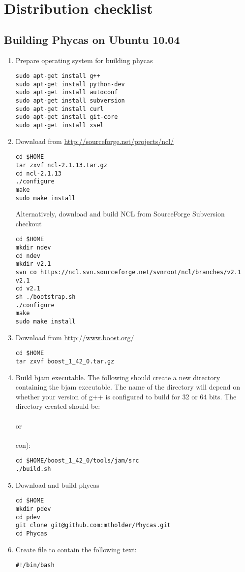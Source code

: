 \chapter{Distribution checklist} 

\section{Building Phycas on Ubuntu 10.04}

\begin{enumerate}
\item Prepare operating system for building phycas
\begin{verbatim}
sudo apt-get install g++
sudo apt-get install python-dev
sudo apt-get install autoconf
sudo apt-get install subversion
sudo apt-get install curl
sudo apt-get install git-core
sudo apt-get install xsel
\end{verbatim}
%
\item Download  from \url{http://sourceforge.net/projects/ncl/}
\begin{verbatim}
cd $HOME
tar zxvf ncl-2.1.13.tar.gz
cd ncl-2.1.13
./configure
make
sudo make install
\end{verbatim}
Alternatively, download and build NCL from SourceForge Subversion checkout
\begin{verbatim}
cd $HOME
mkdir ndev
cd ndev
mkdir v2.1
svn co https://ncl.svn.sourceforge.net/svnroot/ncl/branches/v2.1 v2.1
cd v2.1
sh ./bootstrap.sh
./configure
make
sudo make install
\end{verbatim}
%
\item Download  from \url{http://www.boost.org/}
\begin{verbatim}
cd $HOME
tar zxvf boost_1_42_0.tar.gz
\end{verbatim}
%
\item Build bjam executable.
The following should create a new directory 
containing the bjam executable. 
The name of the directory will depend on whether your version of g++ is configured
to build for 32 or 64 bits. 
The directory created should be:\\
\\
or \\
 \\
con):
\begin{verbatim}
cd $HOME/boost_1_42_0/tools/jam/src
./build.sh
\end{verbatim}
%
\item Download and build phycas
\begin{verbatim}
cd $HOME
mkdir pdev
cd pdev
git clone git@github.com:mtholder/Phycas.git
cd Phycas
\end{verbatim}
%
\item Create file  to contain the following text:
\begin{verbatim}
#!/bin/bash


\end{verbatim}
\end{enumerate}
